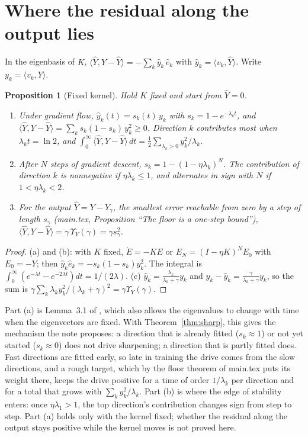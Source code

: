 \documentclass[11pt]{article}
\newtheorem{proposition}{Proposition}
\theoremstyle{definition}
\theoremstyle{remark}
\newcommand{\ip}[2]{\langle #1,#2\rangle}
\begin{document}
\section{Where the residual along the output lies}\label{sec:where}

In the eigenbasis of $K$, $\ip{\hat Y}{Y - \hat Y} = -\sum_k\hat y_k\,\hat e_k$ with $\hat y_k = \ip{v_k}{\hat Y}$.
Write $y_k = \ip{v_k}{Y}$.

\begin{proposition}[Fixed kernel]\label{prop:fixed}
Hold $K$ fixed and start from $\hat Y = 0$.
\begin{enumerate}[label=(\alph*)]
\item Under gradient flow, $\hat y_k(t) = s_k(t)\,y_k$ with $s_k = 1 - e^{-\lambda_kt}$, and
$\ip{\hat Y}{Y - \hat Y} = \sum_k s_k(1 - s_k)\,y_k^2 \ge 0$.
Direction $k$ contributes most when $\lambda_kt = \ln2$, and $\int_0^\infty\ip{\hat Y}{Y - \hat Y}\,dt = \frac12\sum_{\lambda_k>0}y_k^2/\lambda_k$.
\item After $N$ steps of gradient descent, $s_k = 1 - (1-\eta\lambda_k)^N$. The contribution of direction $k$ is nonnegative if $\eta\lambda_k\le1$, and alternates in sign with $N$ if $1 < \eta\lambda_k < 2$.
\item For the output $\hat Y = Y - Y_\gamma$, the smallest error reachable from zero by a step of length $s_\gamma$ (main.tex, Proposition ``The floor is a one-step bound''), $\ip{\hat Y}{Y - \hat Y} = \gamma\,\Upsilon_Y(\gamma) = \gamma s_\gamma^2$.
\end{enumerate}
\end{proposition}

\begin{proof}
(a) and (b): with $K$ fixed, $\dot E = -KE$ or $E_{N} = (I - \eta K)^NE_0$ with $E_0 = -Y$; then $\hat y_k\hat e_k = -s_k(1-s_k)y_k^2$. The integral is $\int_0^\infty(e^{-\lambda t} - e^{-2\lambda t})dt = 1/(2\lambda)$.
(c) $\hat y_k = \frac{\lambda_k}{\lambda_k+\gamma}y_k$ and $y_k - \hat y_k = \frac{\gamma}{\lambda_k+\gamma}y_k$, so the sum is $\gamma\sum_k\lambda_ky_k^2/(\lambda_k+\gamma)^2 = \gamma\Upsilon_Y(\gamma)$.
\end{proof}

Part (a) is Lemma~3.1 of \cite{liwangli2022}, which also allows the eigenvalues to change with time when the eigenvectors are fixed.
With Theorem~\ref{thm:sharp}, this gives the mechanism the note proposes: a direction that is already fitted ($s_k\approx1$) or not yet started ($s_k\approx0$) does not drive sharpening; a direction that is partly fitted does.
Fast directions are fitted early, so late in training the drive comes from the slow directions, and a rough target, which by the floor theorem of main.tex puts its weight there, keeps the drive positive for a time of order $1/\lambda_k$ per direction and for a total that grows with $\sum_k y_k^2/\lambda_k$.
Part (b) is where the edge of stability enters: once $\eta\lambda_1 > 1$, the top direction's contribution changes sign from step to step.
Part (a) holds only with the kernel fixed; whether the residual along the output stays positive while the kernel moves is not proved here.
\end{document}
